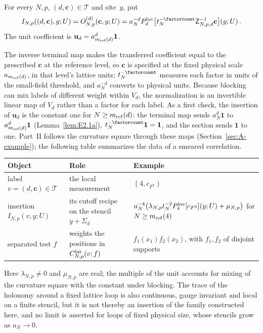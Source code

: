 \begin{definition}\label{def:D08}
For every $N,p$, $(d,\mathbf c)\in\mathcal T$ and site~$y$, put
\begin{equation*}
I_{N,p}((d,\mathbf c),y;U)=O^{(d)}_{N,p}(\mathbf c,y;U)
=a_N^{-d}\localsection{d}\bigl[t_N^{-\factorcount}\mathsf Z_{N,p,d}^{-1}\mathbf c\bigr](y;U)\,.
\end{equation*}
The unit coefficient is $\mathbf u_d=a_{m_{\mathrm{ref}}(d)}^d\mathbf1$.
\end{definition}

The inverse terminal map makes the transferred coefficient equal to the prescribed $\mathbf c$ at the reference level, so $\mathbf c$ is specified at the fixed physical scale $a_{m_{\mathrm{ref}}(d)}$, in that level's lattice units; $t_N^{-\factorcount}$ measures each factor in units of the small-field threshold, and $a_N^{-d}$ converts to physical units. Because blocking can mix labels of different weight within $V_d$, the normalization is an invertible linear map of $V_d$ rather than a factor for each label. As a first check, the insertion of $\mathbf u_d$ is the constant one for $N\ge m_{\mathrm{ref}}(d)$: the terminal map sends $a_N^d\mathbf1$ to $a_{m_{\mathrm{ref}}(d)}^d\mathbf1$ (Lemma~\ref{lem:E2.1a}), $t_N^{-\factorcount}\mathbf1=\mathbf1$, and the section sends $\mathbf1$ to one. Part~II follows the curvature square through these maps (Section~\ref{sec:A-example}); the following table summarizes the data of a smeared correlation.
\begin{center}\small
\begin{tabular}{@{}p{}p{}p{}@{}}
\toprule
\raggedright Object & \raggedright Role & \raggedright Example\tabularnewline
\midrule
\raggedright label $v=(d,\mathbf c)\in\mathcal T$ & \raggedright the local measurement & \raggedright $(4,c_{F^2})$\tabularnewline
\raggedright insertion $I_{N,p}(v,y;U)$ & \raggedright its cutoff recipe on the stencil $y+\Sigma_d$ & \raggedright $a_N^{-4}\bigl(\lambda_{N,p}t_N^{-2}P_{4}^{\mathrm{loc}}[c_{F^2}](y;U)+\mu_{N,p}\bigr)$ for $N\ge m_{\mathrm{ref}}(4)$\tabularnewline
\raggedright separated test $f$ & \raggedright weights the positions in $C^{\mathrm{lat}}_{N,p}(v;f)$ & \raggedright $f_1(x_1)f_2(x_2)$, with $f_1,f_2$ of disjoint supports\tabularnewline
\bottomrule
\end{tabular}
\end{center}
Here $\lambda_{N,p}\ne0$ and $\mu_{N,p}$ are real; the multiple of the unit accounts for mixing of the curvature square with the constant under blocking. The trace of the holonomy around a fixed lattice loop is also continuous, gauge invariant and local on a finite stencil, but it is not thereby an insertion of the family constructed here, and no limit is asserted for loops of fixed physical size, whose stencils grow as $a_N\to0$.

